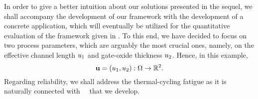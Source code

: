 In order to give a better intuition about our solutions presented in the sequel, we shall accompany the development of our framework with the development of a concrete application, which will eventually be utilized for the quantitative evaluation of the framework given in .
To this end, we have decided to focus on two process parameters, which are arguably the most crucial ones, namely, on the effective channel length $u_1$ and gate-oxide thickness $u_2$.
Hence, in this example,
\begin{equation} \elab{application-uncertain-parameters}
  \vu = (\Leff, \Tox): \outcomes \to \real^2.
\end{equation}
Regarding reliability, we shall address the thermal-cycling fatigue as it is naturally connected with \DSS\ \ta\ that we develop.
